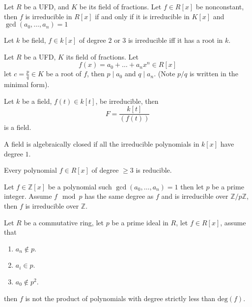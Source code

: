\documentclass[openany]{book}
\newcommand{\Z}{\mathbb{Z}}
\begin{document}
\begin{prop}
    Let $R$ be a UFD, and $K$ be its field of fractions. Let $f\in R[x]$ be nonconstant, then $f$ is irreducible in $R[x]$ if and only if it is irreducible in $K[x]$ and $\gcd(a_0,\dots, a_n)=1$ 
\end{prop}

\begin{prop}
    Let $k$ be field, $f\in k[x]$ of degree $2$ or $3$ is irreducible iff it has a root in $k$.
\end{prop}

\begin{prop}
    Let $R$ be a UFD, $K$ its field of fractions.  Let 
    \begin{equation*}
        f(x)=a_0+\dots+a_nx^n\in R[x]
    \end{equation*}
    let $c=\frac{p}{q}\in K$ be a root of $f$, then $p\mid a_0$ and $q\mid a_n$.  (Note $p/q$ is written in the minimal form).
\end{prop}


\begin{prop}
    Let $k$ be a field, $f(t)\in k[t]$, be irreducible, then 
    \begin{equation*}
        F=\frac{k[t]}{(f(t))}
    \end{equation*}
    is a field.
\end{prop}


\begin{defn}
    A field is algebraically closed if all the irreducible polynomials in $k[x]$ have degree $1$.
\end{defn}


\begin{prop}
    Every polynomial $f\in R[x]$ of degree $\geq 3$ is reducible.
\end{prop}

\begin{prop}
    Let $f\in\Z[x]$ be a polynomial such $\gcd(a_0,\dots, a_n)=1$ then let $p$ be a prime integer. Assume $f\mod p$ has the same degree as $f$ and is irreducible over $\Z/p\Z$, then $f$ is irreducible over $\Z$.
\end{prop}

\begin{prop}
    Let $R$ be a commutative ring, let $p$ be a prime ideal in $R$, let $f\in R[x]$, assume that 
    \begin{enumerate}
        \item $a_n\not\in p$.
        \item $a_i\in p$.
        \item $a_0\not\in p^2$.
    \end{enumerate}
    then $f$ is not the product of polynomials with degree strictly less than $\text{deg}(f)$.
\end{prop}
\end{document}

